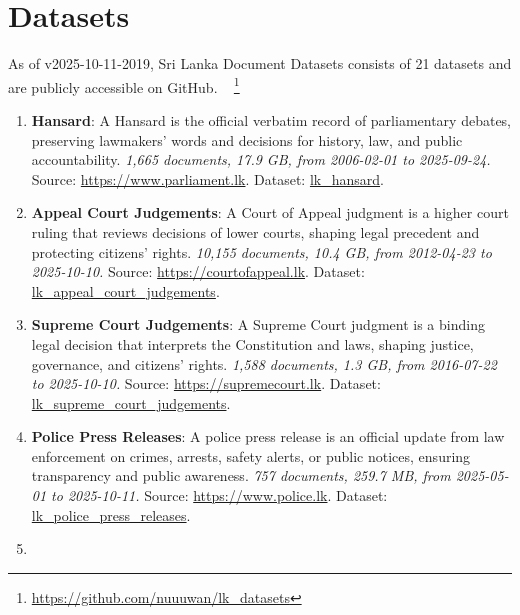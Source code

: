 \documentclass[10pt,a4paper]{article}%
\begin{document}
%
\section{Datasets}%
\label{sec:Datasets}%
As of v2025-10-11-2019, Sri Lanka Document Datasets
  consists of 21 datasets
 and are publicly accessible on GitHub.%
~%
\footnote{\href{https://github.com/nuuuwan/lk\_datasets}{https://github.com/nuuuwan/lk\_datasets}}%

%
\begin{enumerate}%
\item%
\textbf{Hansard}: A Hansard is the official verbatim record of parliamentary debates, preserving lawmakers’ words and decisions for history, law, and public accountability.\textit{ 1,665 documents, 17.9 GB, from 2006{-}02{-}01 to 2025{-}09{-}24.} Source: \href{https://www.parliament.lk}{https://www.parliament.lk}. Dataset: \href{https://github.com/nuuuwan/lk\_hansard/tree/data/data/lk\_hansard}{lk\_hansard}.%
\item%
\textbf{Appeal Court Judgements}: A Court of Appeal judgment is a higher court ruling that reviews decisions of lower courts, shaping legal precedent and protecting citizens’ rights.\textit{ 10,155 documents, 10.4 GB, from 2012{-}04{-}23 to 2025{-}10{-}10.} Source: \href{https://courtofappeal.lk}{https://courtofappeal.lk}. Dataset: \href{https://github.com/nuuuwan/lk\_appeal\_court\_judgements/tree/data/data/lk\_appeal\_court\_judgements}{lk\_appeal\_court\_judgements}.%
\item%
\textbf{Supreme Court Judgements}: A Supreme Court judgment is a binding legal decision that interprets the Constitution and laws, shaping justice, governance, and citizens’ rights.\textit{ 1,588 documents, 1.3 GB, from 2016{-}07{-}22 to 2025{-}10{-}10.} Source: \href{https://supremecourt.lk}{https://supremecourt.lk}. Dataset: \href{https://github.com/nuuuwan/lk\_supreme\_court\_judgements/tree/data/data/lk\_supreme\_court\_judgements}{lk\_supreme\_court\_judgements}.%
\item%
\textbf{Police Press Releases}: A police press release is an official update from law enforcement on crimes, arrests, safety alerts, or public notices, ensuring transparency and public awareness.\textit{ 757 documents, 259.7 MB, from 2025{-}05{-}01 to 2025{-}10{-}11.} Source: \href{https://www.police.lk}{https://www.police.lk}. Dataset: \href{https://github.com/nuuuwan/lk\_police\_press\_releases/tree/data/data/lk\_police\_press\_releases}{lk\_police\_press\_releases}.%
\item%

\end{enumerate}
\end{document}
